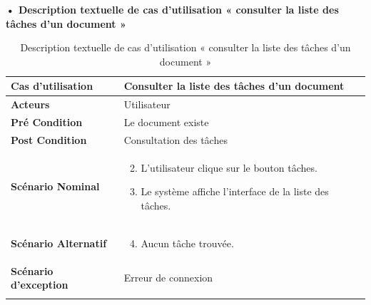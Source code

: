     
    



\textbf{•	Description textuelle de cas d'utilisation « consulter la liste des tâches d'un document »}

\begin{longtable}{|p{5cm}|p{10cm}|}
\hline
\textbf{Cas d'utilisation}&Consulter la liste des tâches d'un document\\
\hline
\textbf{Acteurs}&Utilisateur\\
\hline
\textbf{Pré Condition}&Le document existe\\
\hline
\textbf{Post Condition}&Consultation des tâches\\
\hline
\textbf{Scénario Nominal}&
\vspace{-\baselineskip}
\begin{enumerate}
    \setcounter{enumi}{1}
    \item L'utilisateur clique sur le bouton tâches.
    \item Le système affiche l'interface de la liste des tâches.
    
\end{enumerate}\\
\hline
\textbf{Scénario Alternatif}&
\vspace{-\baselineskip}
\begin{enumerate}
    \setcounter{enumi}{3}
    \item Aucun tâche trouvée.
\end{enumerate}\\
\hline
\textbf{Scénario d'exception}&Erreur de connexion\\
\hline
\caption{Description textuelle de cas d'utilisation « consulter la liste des tâches d'un document »}
\label{tab:DescriptionTextuelleDeCasDUtilisationConsulterLaListeDesTachesDUnDocument}
\end{longtable}



